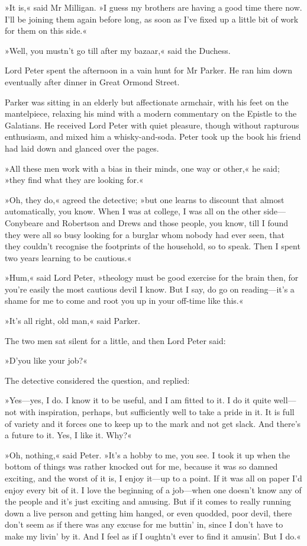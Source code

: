 »It is,« said Mr Milligan. »I guess my brothers are having a good time there now. I'll be joining them again before long, as soon as I've fixed up a little bit of work for them on this side.«

»Well, you mustn't go till after my bazaar,« said the Duchess.

Lord Peter spent the afternoon in a vain hunt for Mr Parker. He ran him down eventually after dinner in Great Ormond Street.

Parker was sitting in an elderly but affectionate armchair, with his feet on the mantelpiece, relaxing his mind with a modern commentary on the Epistle to the Galatians. He received Lord Peter with quiet pleasure, though without rapturous enthusiasm, and mixed him a whisky-and-soda. Peter took up the book his friend had laid down and glanced over the pages.

»All these men work with a bias in their minds, one way or other,« he said; »they find what they are looking for.«

»Oh, they do,« agreed the detective; »but one learns to discount that almost automatically, you know. When I was at college, I was all on the other side\allowbreak---\allowbreak Conybeare and Robertson and Drews and those people, you know, till I found they were all so busy looking for a burglar whom nobody had ever seen, that they couldn't recognise the footprints of the household, so to speak. Then I spent two years learning to be cautious.«

»Hum,« said Lord Peter, »theology must be good exercise for the brain then, for you're easily the most cautious devil I know. But I say, do go on reading\allowbreak---\allowbreak it's a shame for me to come and root you up in your off-time like this.«

»It's all right, old man,« said Parker.

The two men sat silent for a little, and then Lord Peter said:

»D'you like your job?«

The detective considered the question, and replied:

»Yes\allowbreak---\allowbreak yes, I do. I know it to be useful, and I am fitted to it. I do it quite well\allowbreak---\allowbreak not with inspiration, perhaps, but sufficiently well to take a pride in it. It is full of variety and it forces one to keep up to the mark and not get slack. And there's a future to it. Yes, I like it. Why?«

»Oh, nothing,« said Peter. »It's a hobby to me, you see. I took it up when the bottom of things was rather knocked out for me, because it was so damned exciting, and the worst of it is, I enjoy it\allowbreak---\allowbreak up to a point. If it was all on paper I'd enjoy every bit of it. I love the beginning of a job\allowbreak---\allowbreak when one doesn't know any of the people and it's just exciting and amusing. But if it comes to really running down a live person and getting him hanged, or even quodded, poor devil, there don't seem as if there was any excuse for me buttin' in, since I don't have to make my livin' by it. And I feel as if I oughtn't ever to find it amusin'. But I do.«

